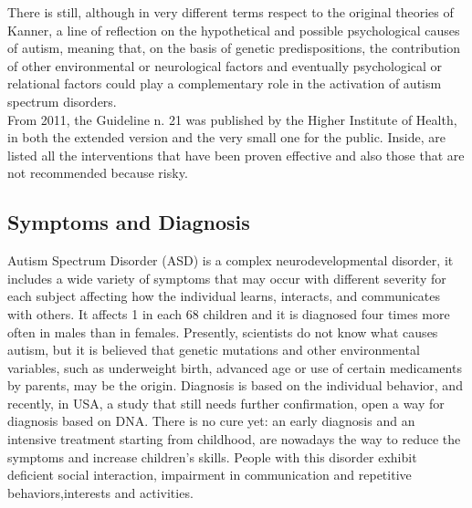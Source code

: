 There is still, although in very different terms respect to the original theories of Kanner, a line of reflection on the hypothetical and possible psychological causes of autism, meaning that, on the basis of genetic predispositions, the contribution of other environmental or neurological factors and eventually psychological or relational factors could play a complementary role in the activation of autism spectrum disorders.\\
From 2011, the Guideline n. 21 was published by the Higher Institute of Health, in both the extended version and the very small one for the public. Inside, are listed all the interventions that have been proven effective and also those that are not recommended because risky.
\subsection{Symptoms and Diagnosis}
Autism Spectrum Disorder (ASD) is a complex neurodevelopmental disorder, it includes a wide variety of symptoms that may occur with different severity for each subject\cite{wall2007autism}\cite{happe2008fractionable} affecting how the individual learns, interacts, and communicates with others\cite{american2013diagnostic}.
It affects 1 in each 68 children\cite{christensen2016prevalence} and it is diagnosed four times more often in males than in females\cite{american2013diagnostic}.  Presently, scientists do not know what causes autism, but it is believed that genetic mutations and other environmental variables, such as underweight birth, advanced age or use of certain medicaments by parents, may be the origin. Diagnosis is based on the individual behavior, and recently, in USA, a study that still needs further confirmation, open a way for diagnosis based on DNA\cite{howsmon2017classification}. There is no cure yet: an early diagnosis and an intensive treatment starting from childhood, are nowadays the way to reduce the symptoms and increase children's skills.  
People with this disorder exhibit deficient social interaction, impairment in communication and repetitive behaviors,interests and activities\cite{american2013diagnostic}.\\

